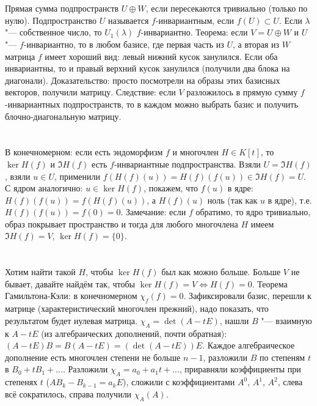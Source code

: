 \section{} %
Прямая сумма подпространств $U \oplus W$, если пересекаются тривиально (только по нулю).
Подпространство $U$ называется $f$-инвариантным, если $f(U) \subset U$.
Если $\lambda$ "--- собственное число, то $U_1(\lambda)$ $f$-инвариантно.
Теорема: если $V = U \oplus W$ и $U$ "--- $f$-инвариантно, то в любом базисе, где первая часть из $U$, а вторая из $W$ матрица $f$ имеет хороший вид: левый нижний кусок занулился.
Если оба инвариантны, то и правый верхний кусок занулился (получили два блока на диагонали).
Доказательство: просто посмотрели на образы этих базисных векторов, получили матрицу.
Следствие: если $V$ разложилось в прямую сумму $f$-инвариантных подпространств, то в каждом можно выбрать базис и получить блочно-диагональную матрицу.

\section{} %
В конечномерном: если есть эндоморфизм $f$ и многочлен $H \in K[t]$, то $\ker H(f)$ и $\Im H(f)$ есть $f$-инвариантные подпространства.
Взяли $U=\Im H(f)$, взяли $u \in U$, применили $f(H(f)(u)) = H(f)(f(u)) \in \Im H(f) = U$.
С ядром аналогично: $u \in \ker H(f)$, покажем, что $f(u)$ в ядре: $H(f)(f(u)) = f(H(f)(u))$, а $H(f)(u)$ ноль (так как $u$ в ядре), т.е. $H(f)(f(u))=f(0)=0$.
Замечание: если $f$ обратимо, то ядро тривиально, образ покрывает пространство и тогда для любого многочлена $H$ имеем $\Im H(f) = V$, $\ker H(f) = \{0\}$.

\section{} %
Хотим найти такой $H$, чтобы $\ker H(f)$ был как можно больше.
Больше $V$ не бывает, давайте найдём так, чтобы $\ker H(f) = V \iff H(f) = 0$.
Теорема Гамильтона-Кэли: в конечномерном $\chi_f(f) = 0$.
Зафиксировали базис, перешли к матрице (характеристический многочлен прежний), надо показать, что результатом будет нулевая матрица.
$\chi_A=\det (A - tE)$, нашли $B$ "--- взаимную к $A-tE$ (из алгебраических дополнений, почти обратная): $(A-tE)B=B(A-tE)=(\det(A-tE))E$.
Каждое алгебраическое дополнение есть многочлен степени не больше $n-1$, разложили $B$ по степеням $t$ в $B_0+tB_1+\dots$.
Разложили $\chi_A=a_0+a_1t+\dots$, приравняли коэффициенты при степенях $t$ ($AB_k-B_{k-1}=a_kE$), сложили с коэффициентами $A^0$, $A^1$, $A^2$, слева всё сократилось,
справа получили $\chi_A(A)$.

